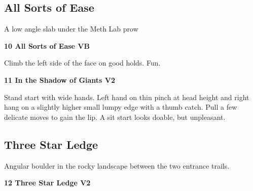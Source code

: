 \begin{multicols}{2}
\begin{minipage}{\columnwidth}
			\subsection*{All Sorts of Ease}\label{bf:All Sorts of Ease}
			A low angle slab under the Meth Lab prow
			
			\end{minipage}
			

					\begin{minipage}{\linewidth}	
					\label{rt:All Sorts of Ease}
\colorbox{green!20}{
\parbox{0.95\textwidth}{
\textbf{
10 All Sorts of Ease VB    
}
}
}

					\begin{adjustwidth}{0.5cm}{}				
					Climb the left side of the face on good holds. Fun.
					\end{adjustwidth}
					\end{minipage}
					\begin{minipage}{\linewidth}	
					\label{rt:In the Shadow of Giants}
\colorbox{green!20}{
\parbox{0.95\textwidth}{
\textbf{
11 In the Shadow of Giants V2   
}
}
}

					\begin{adjustwidth}{0.5cm}{}				
					Stand start with wide hands. Left hand on thin pinch at head height and right hang on a slightly higher small lumpy edge with a thumb catch. Pull a few delicate moves to gain the lip. A sit start looks doable, but unpleasant.
					\end{adjustwidth}
					\end{minipage}
			\begin{minipage}{\columnwidth}
			\subsection*{Three Star Ledge}\label{bf:Three Star Ledge}
			Angular boulder in the rocky landscape between the two entrance trails.
			
			\end{minipage}
			

					\begin{minipage}{\linewidth}	
					\label{rt:Three Star Ledge}
\colorbox{green!20}{
\parbox{0.95\textwidth}{
\textbf{
12 Three Star Ledge V2    
}
}
}


\end{minipage}
\end{multicols}
